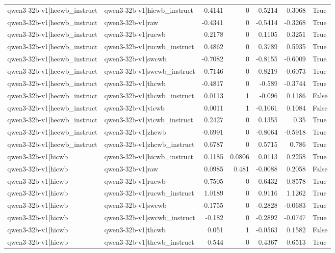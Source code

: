 \begin{table}
\begin{tabular}{l l r r r r l}
qwen3-32b-v1|hecwb_instruct & qwen3-32b-v1|hicwb_instruct & -0.4141 & 0 & -0.5214 & -0.3068 & True \\
qwen3-32b-v1|hecwb_instruct & qwen3-32b-v1|raw & -0.4341 & 0 & -0.5414 & -0.3268 & True \\
qwen3-32b-v1|hecwb_instruct & qwen3-32b-v1|rucwb & 0.2178 & 0 & 0.1105 & 0.3251 & True \\
qwen3-32b-v1|hecwb_instruct & qwen3-32b-v1|rucwb_instruct & 0.4862 & 0 & 0.3789 & 0.5935 & True \\
qwen3-32b-v1|hecwb_instruct & qwen3-32b-v1|swcwb & -0.7082 & 0 & -0.8155 & -0.6009 & True \\
qwen3-32b-v1|hecwb_instruct & qwen3-32b-v1|swcwb_instruct & -0.7146 & 0 & -0.8219 & -0.6073 & True \\
qwen3-32b-v1|hecwb_instruct & qwen3-32b-v1|thcwb & -0.4817 & 0 & -0.589 & -0.3744 & True \\
qwen3-32b-v1|hecwb_instruct & qwen3-32b-v1|thcwb_instruct & 0.0113 & 1 & -0.096 & 0.1186 & False \\
qwen3-32b-v1|hecwb_instruct & qwen3-32b-v1|vicwb & 0.0011 & 1 & -0.1061 & 0.1084 & False \\
qwen3-32b-v1|hecwb_instruct & qwen3-32b-v1|vicwb_instruct & 0.2427 & 0 & 0.1355 & 0.35 & True \\
qwen3-32b-v1|hecwb_instruct & qwen3-32b-v1|zhcwb & -0.6991 & 0 & -0.8064 & -0.5918 & True \\
qwen3-32b-v1|hecwb_instruct & qwen3-32b-v1|zhcwb_instruct & 0.6787 & 0 & 0.5715 & 0.786 & True \\
qwen3-32b-v1|hicwb & qwen3-32b-v1|hicwb_instruct & 0.1185 & 0.0806 & 0.0113 & 0.2258 & True \\
qwen3-32b-v1|hicwb & qwen3-32b-v1|raw & 0.0985 & 0.481 & -0.0088 & 0.2058 & False \\
qwen3-32b-v1|hicwb & qwen3-32b-v1|rucwb & 0.7505 & 0 & 0.6432 & 0.8578 & True \\
qwen3-32b-v1|hicwb & qwen3-32b-v1|rucwb_instruct & 1.0189 & 0 & 0.9116 & 1.1262 & True \\
qwen3-32b-v1|hicwb & qwen3-32b-v1|swcwb & -0.1755 & 0 & -0.2828 & -0.0683 & True \\
qwen3-32b-v1|hicwb & qwen3-32b-v1|swcwb_instruct & -0.182 & 0 & -0.2892 & -0.0747 & True \\
qwen3-32b-v1|hicwb & qwen3-32b-v1|thcwb & 0.051 & 1 & -0.0563 & 0.1582 & False \\
qwen3-32b-v1|hicwb & qwen3-32b-v1|thcwb_instruct & 0.544 & 0 & 0.4367 & 0.6513 & True \\

\end{tabular}
\end{table}
